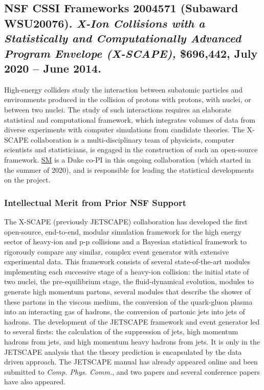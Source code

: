 \documentclass[11pt]{NSFamsart}
\newcommand{\SM}{\hyperlink{SMlink}{SM}\xspace}
\begin{document}
\subsection{NSF CSSI Frameworks 2004571 (Subaward WSU20076). \textit{X-Ion Collisions with a Statistically and Computationally Advanced Program Envelope (X-SCAPE),} \$696,442, July 2020 -- June 2014.} High-energy colliders study the interaction between subatomic particles and environments produced in the collision of protons with protons, with nuclei, or between two nuclei. The study of such interactions requires an elaborate statistical and computational framework, which integrates volumes of data from diverse experiments with computer simulations from candidate theories. The X-SCAPE collaboration is a multi-disciplinary team of physicists, computer scientists and statisticians, is engaged in the construction of such an open-source framework. \SM is a Duke co-PI in this ongoing collaboration (which started in the summer of 2020), and is responsible for leading the statistical developments on the project.

\subsubsection{Intellectual Merit from Prior NSF Support}

The X-SCAPE (previously JETSCAPE) collaboration has developed the first open-source, end-to-end, modular simulation framework for the high energy sector of heavy-ion and p-p collisions and a Bayesian statistical framework to rigorously compare any similar, complex event generator with extensive experimental data. This framework consists of several state-of-the-art modules implementing each successive stage of a heavy-ion collision: the initial state of two nuclei, the pre-equilibrium stage, the fluid-dynamical evolution, modules to generate high momentum partons, several modules that describe the shower of these partons in the viscous medium, the conversion of
the quark-gluon plasma into an interacting gas of hadrons, the conversion of partonic jets into jets of hadrons. The development of the JETSCAPE framework and event generator led to several firsts: the calculation of the suppression of jets, high momentum hadrons from jets, and high momentum heavy hadrons from jets. It is only in the JETSCAPE analysis that the theory prediction is encapsulated by the data driven approach. The JETSCAPE manual has already appeared online \cite{putschke2019jetscape} and been submitted to \textit{Comp. Phys. Comm.}, and two papers \cite{cao2017multistage,kumar2019jetscape} and several conference papers \cite{soltz2018bayesian,tachibana2018jet,kauder2019jetscape,park2019multi} have also appeared.
\end{document}
